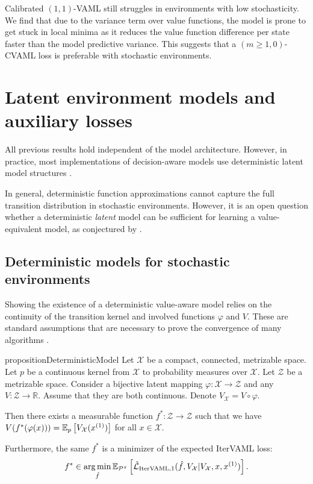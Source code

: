 Calibrated $(1,1)$-VAML still struggles in environments with low stochasticity.
We find that due to the variance term over value functions, the model is prone to get stuck in local minima as it reduces the value function difference per state faster than the model predictive variance.
This suggests that a $(m\geq1,0)$-CVAML loss is preferable with stochastic environments.

\section{Latent environment models and auxiliary losses}
All previous results hold independent of the model architecture.
However, in practice, most implementations of decision-aware models use deterministic latent model structures \cite{schrittwieser2020mastering,ye2021mastering,hansen2022temporal,antonoglou2022planning}.

In general, deterministic function approximations cannot capture the full transition distribution in stochastic environments.
However, it is an open question whether a deterministic \emph{latent} model can be sufficient for learning a value-equivalent model, as conjectured by \textcite{oh2017value}.

\subsection{Deterministic models for stochastic environments}

Showing the existence of a deterministic value-aware model relies on the continuity of the transition kernel and involved functions $\varphi$ and $V$.
These are standard assumptions that are necessary to prove the convergence of many algorithms \parencite{bertsekasshreve1978}.

\begin{restatable}{proposition}{DeterministicModel}\label{prop:3_1}
    Let $\mathcal{X}$ be a compact, connected, metrizable space. Let $p$ be a continuous kernel from $\mathcal{X}$ to probability measures over $\mathcal{X}$. Let $\mathcal{Z}$ be a metrizable space. Consider a bijective latent mapping $\varphi: \mathcal{X} \rightarrow \mathcal{Z}$ and any $V: \mathcal{Z} \rightarrow \mathbb{R}$. Assume that they are both continuous. Denote $V_\mathcal{X} = V \circ \varphi$.
    
    Then there exists a measurable function $f^*: \mathcal{Z} \rightarrow \mathcal{Z}$ such that we have $V(f^*(\varphi(x))) = \mathbb{E}_{p}\left[  V_\mathcal{X}(x^{(1)}) \right]$ for all $x \in \mathcal{X}$.

    Furthermore, the same $f^*$ is a minimizer of the expected IterVAML loss:
    $$f^* \in \operatorname*{arg\,min}_{\hat{f}} \mathbb{E}_{\mathcal{P}^\pi}\left[  \hat{\mathcal{L}}_{\mathrm{IterVAML},1}(\hat{f},V_\mathcal{X}|V_\mathcal{X},x,x^{(1)}) \right].$$
\end{restatable}


